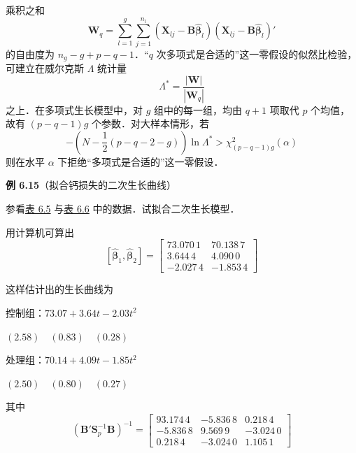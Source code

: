 
乘积之和
\label{eq:6-80}
\begin{equation}
\mathbf{W}_q=\sum_{l=1}^{g}\sum_{j=1}^{n_l}(\mathbf{X}_{lj}-\mathbf{B}\hat{\boldsymbol{\beta}}_l)(\mathbf{X}_{lj}-\mathbf{B}\hat{\boldsymbol{\beta}}_l)' \tag{6-80}
\end{equation}
的自由度为 $n_g-g+p-q-1$．“$q$ 次多项式是合适的”这一零假设的似然比检验，可建立在威尔克斯 $\Lambda$ 统计量
\label{eq:6-81}
\begin{equation}
\Lambda^*=\frac{|\mathbf{W}|}{|\mathbf{W}_q|} \tag{6-81}
\end{equation}
之上．在多项式生长模型中，对 $g$ 组中的每一组，均由 $q+1$ 项取代 $p$ 个均值，故有 $(p-q-1)g$ 个参数．对大样本情形，若
\label{eq:6-82}
\begin{equation}
-\left(N-\frac{1}{2}(p-q-2-g)\right)\ln\Lambda^*>\chi_{(p-q-1)g}^{2}(\alpha) \tag{6-82}
\end{equation}
则在水平 $\alpha$ 下拒绝“多项式是合适的”这一零假设．

\noindent\textbf{例 6.15}\quad （拟合钙损失的二次生长曲线）

参看\hyperref[tab:6.5]{表 6.5} 与\hyperref[tab:6.6]{表 6.6} 中的数据．试拟合二次生长模型．

用计算机可算出
\[
[\hat{\boldsymbol{\beta}}_1,\hat{\boldsymbol{\beta}}_2]=\begin{bmatrix}73.070\,1&70.138\,7\\3.644\,4&4.090\,0\\-2.027\,4&-1.853\,4\end{bmatrix}
\]

这样估计出的生长曲线为

\noindent 控制组：$73.07+3.64t-2.03t^2$

\noindent\hspace*{3em}$(2.58)\quad(0.83)\quad(0.28)$

\noindent 处理组：$70.14+4.09t-1.85t^2$

\noindent\hspace*{3em}$(2.50)\quad(0.80)\quad(0.27)$

其中
\[
(\mathbf{B}'\mathbf{S}_p^{-1}\mathbf{B})^{-1}=\begin{bmatrix}93.174\,4&-5.836\,8&0.218\,4\\-5.836\,8&9.569\,9&-3.024\,0\\0.218\,4&-3.024\,0&1.105\,1\end{bmatrix}
\]

